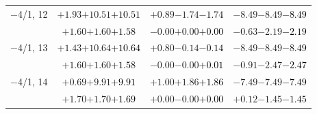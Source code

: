 \documentclass[compress]{beamer}
\begin{document}
\begin{frame}
\begin{tabular}{r | c | c | c}
$-$4/1, 12 & $+1.93$\hspace{0.1 cm}$+10.51$\hspace{0.1 cm}\textcolor{black}{$+10.51$} & $+0.89$\hspace{0.1 cm}$-1.74$\hspace{0.1 cm}\textcolor{black}{$-1.74$} & $-8.49$\hspace{0.1 cm}$-8.49$\hspace{0.1 cm}\textcolor{black}{$-8.49$} \\
           & $+1.60$\hspace{0.1 cm}$+1.60$\hspace{0.1 cm}\textcolor{black}{$+1.58$} & $-0.00$\hspace{0.1 cm}$+0.00$\hspace{0.1 cm}\textcolor{black}{$+0.00$} & $-0.63$\hspace{0.1 cm}$-2.19$\hspace{0.1 cm}\textcolor{black}{$-2.19$} \\
$-$4/1, 13 & $+1.43$\hspace{0.1 cm}$+10.64$\hspace{0.1 cm}\textcolor{black}{$+10.64$} & $+0.80$\hspace{0.1 cm}$-0.14$\hspace{0.1 cm}\textcolor{black}{$-0.14$} & $-8.49$\hspace{0.1 cm}$-8.49$\hspace{0.1 cm}\textcolor{black}{$-8.49$} \\
           & $+1.60$\hspace{0.1 cm}$+1.60$\hspace{0.1 cm}\textcolor{black}{$+1.58$} & $-0.00$\hspace{0.1 cm}$-0.00$\hspace{0.1 cm}\textcolor{black}{$+0.01$} & $-0.91$\hspace{0.1 cm}$-2.47$\hspace{0.1 cm}\textcolor{black}{$-2.47$} \\
$-$4/1, 14 & $+0.69$\hspace{0.1 cm}$+9.91$\hspace{0.1 cm}\textcolor{black}{$+9.91$} & $+1.00$\hspace{0.1 cm}$+1.86$\hspace{0.1 cm}\textcolor{black}{$+1.86$} & $-7.49$\hspace{0.1 cm}$-7.49$\hspace{0.1 cm}\textcolor{black}{$-7.49$} \\
           & $+1.70$\hspace{0.1 cm}$+1.70$\hspace{0.1 cm}\textcolor{black}{$+1.69$} & $+0.00$\hspace{0.1 cm}$-0.00$\hspace{0.1 cm}\textcolor{black}{$+0.00$} & $+0.12$\hspace{0.1 cm}$-1.45$\hspace{0.1 cm}\textcolor{black}{$-1.45$} \\

\end{tabular}
\end{frame}
\end{document}
